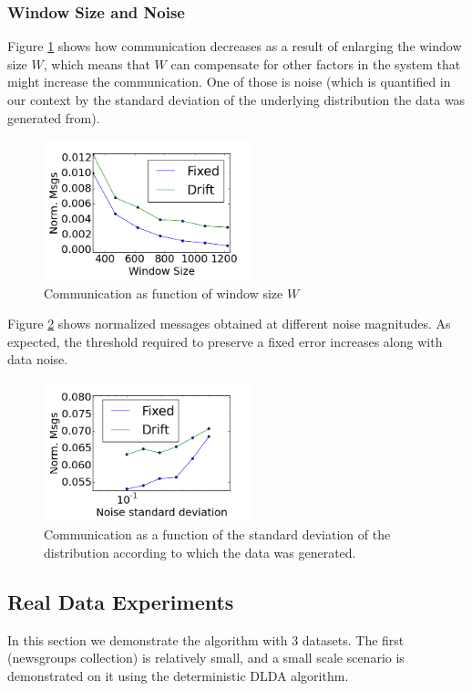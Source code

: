 \documentclass{sig-alternate-05-2015}
\begin{document}
\subsubsection{Window Size and Noise}
Figure \ref{WindowSize} shows how communication decreases as a result
of enlarging the window size $W$, which means that $W$ can compensate for other
factors in the system that might increase the communication. One of those is
noise (which is quantified in our context by the standard deviation of the
underlying distribution the data was generated from).
 \begin{figure}[h]
	\centering
	\includegraphics[width=60mm]{CommunicationOfFixedVsDrift/WindowSize.png}
	\caption{Communication as function of window size $W$}
	\label{WindowSize}
	\end{figure}
Figure \ref{Noise} shows normalized messages obtained at different
noise magnitudes. As expected, the threshold required to preserve a
fixed error increases along with data noise.
\begin{figure}[h]
	\centering
	\includegraphics[width=60mm]{CommunicationOfFixedVsDrift/Noise.png}
	\caption{Communication as a function of the standard deviation of the
	distribution according to which the data was generated.}
	\label{Noise}
	\end{figure}

\subsection{Real Data Experiments}
In this section we demonstrate the algorithm with 3 datasets. The first
(newsgroups collection) is relatively small, and a small scale
scenario is demonstrated on it using the deterministic DLDA algorithm. 
\end{document}
